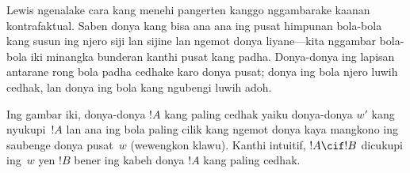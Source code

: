 \documentclass[../../../include/open-logic-section]{subfiles}
\begin{document}
Lewis ngenalake cara kang menehi pangerten kanggo nggambarake
kaanan kontrafaktual. Saben donya kang bisa ana ana ing pusat
himpunan bola-bola kang susun ing njero siji lan sijine lan
ngemot donya liyane---kita nggambar bola-bola iki minangka
bunderan kanthi pusat kang padha. Donya-donya ing lapisan
antarane rong bola padha cedhake karo donya pusat; donya ing
bola njero luwih cedhak, lan donya ing bola kang ngubengi
luwih adoh.
\begin{center}
\end{center}
Ing gambar iki, donya-donya $!A$ kang paling cedhak yaiku
donya-donya $w'$ kang nyukupi~$!A$ lan ana ing bola paling
cilik kang ngemot donya kaya mangkono ing saubenge donya
pusat~$w$ (wewengkon klawu). Kanthi intuitif, $!A \cif !B$
dicukupi ing~$w$ yen $!B$ bener ing kabeh donya $!A$ kang
paling cedhak.
\end{document}
